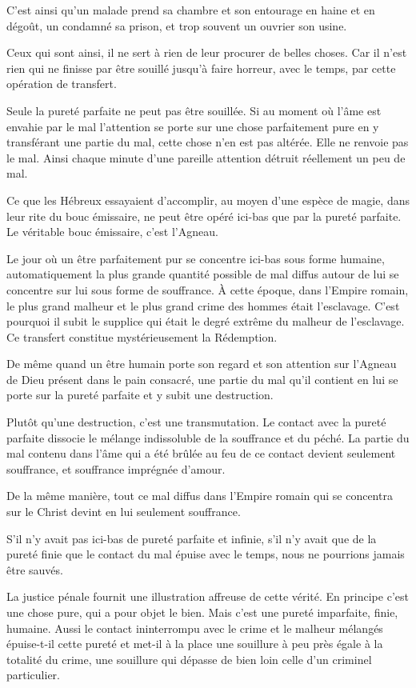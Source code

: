 \documentclass[french,twoside]{book} %
\begin{document}
C'est ainsi qu'un malade prend sa chambre et son entourage en haine et en dégoût, un condamné sa prison, et trop souvent un ouvrier son usine.\par
Ceux qui sont ainsi, il ne sert à rien de leur procurer de belles choses. Car il n'est rien qui ne finisse par être souillé jusqu'à faire horreur, avec le temps, par cette opération de transfert.\par
Seule la pureté parfaite ne peut pas être souillée. Si au moment où l'âme est envahie par le mal l'attention se porte sur une chose parfaitement pure en y transférant une partie du mal, cette chose n'en est pas altérée. Elle ne renvoie pas le mal. Ainsi chaque minute d'une pareille attention détruit réellement un peu de mal.\par
Ce que les Hébreux essayaient d'accomplir, au moyen d'une espèce de magie, dans leur rite du bouc émissaire, ne peut être opéré ici-bas que par la pureté parfaite. Le véritable bouc émissaire, c'est l'Agneau.\par
Le jour où un être parfaitement pur se concentre ici-bas sous forme humaine, automatiquement la plus grande quantité possible de mal diffus autour de lui se concentre sur lui sous forme de souffrance. À cette époque, dans l'Empire romain, le plus grand malheur et le plus grand crime des hommes était l'esclavage. C'est pourquoi il subit le supplice qui était le degré extrême du malheur de l'esclavage. Ce transfert constitue mystérieusement la Rédemption.\par
De même quand un être humain porte son regard et son attention sur l'Agneau de Dieu présent dans le pain consacré, une partie du mal qu'il contient en lui se porte sur la pureté parfaite et y subit une destruction.\par
Plutôt qu'une destruction, c'est une transmutation. Le contact avec la pureté parfaite dissocie le mélange indissoluble de la souffrance et du péché. La partie du mal contenu dans l'âme qui a été brûlée au feu de ce contact devient seulement souffrance, et souffrance imprégnée d'amour.\par
De la même manière, tout ce mal diffus dans l'Empire romain qui se concentra sur le Christ devint en lui seulement souffrance.\par
S'il n'y avait pas ici-bas de pureté parfaite et infinie, s'il n'y avait que de la pureté finie que le contact du mal épuise avec le temps, nous ne pourrions jamais être sauvés.\par
La justice pénale fournit une illustration affreuse de cette vérité. En principe c'est une chose pure, qui a pour objet le bien. Mais c'est une pureté imparfaite, finie, humaine. Aussi le contact ininterrompu avec le crime et le malheur mélangés épuise-t-il cette pureté et met-il à la place une souillure à peu près égale à la totalité du crime, une souillure qui dépasse de bien loin celle d'un criminel particulier.\par
\end{document}
